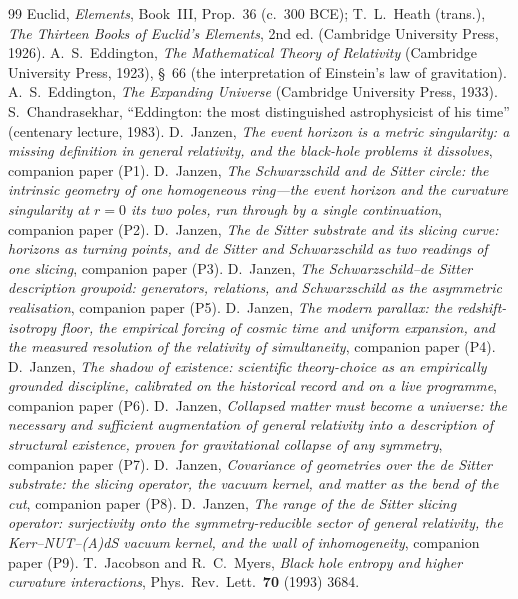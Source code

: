 \documentclass[11pt,a4paper]{article}
\theoremstyle{definition}
\begin{document}
\begin{thebibliography}{99}
 Euclid, \emph{Elements}, Book~III, Prop.~36 (c.~300 BCE);
T.~L.~Heath (trans.), \emph{The Thirteen Books of Euclid's Elements}, 2nd ed.
(Cambridge University Press, 1926).
 A.~S.~Eddington, \emph{The Mathematical Theory of
Relativity} (Cambridge University Press, 1923), \S~66 (the interpretation of
Einstein's law of gravitation).
 A.~S.~Eddington, \emph{The Expanding Universe}
(Cambridge University Press, 1933).
 S.~Chandrasekhar, ``Eddington: the most
distinguished astrophysicist of his time'' (centenary lecture, 1983).
 D.~Janzen, \emph{The event horizon is a metric singularity: a missing definition in general relativity, and the black-hole problems it dissolves}, companion paper (P1).
 D.~Janzen, \emph{The Schwarzschild and de Sitter circle: the intrinsic geometry of one homogeneous ring---the event horizon and the curvature singularity at $r=0$ its two poles, run through by a single continuation}, companion paper (P2).
 D.~Janzen, \emph{The de Sitter substrate and its slicing curve: horizons as turning points, and de Sitter and Schwarzschild as two readings of one slicing}, companion paper (P3).
 D.~Janzen, \emph{The Schwarzschild--de Sitter description groupoid: generators, relations, and Schwarzschild as the asymmetric realisation}, companion paper (P5).
 D.~Janzen, \emph{The modern parallax: the redshift-isotropy floor, the empirical forcing of cosmic time and uniform expansion, and the measured resolution of the relativity of simultaneity}, companion paper (P4).
 D.~Janzen, \emph{The shadow of existence: scientific theory-choice as an empirically grounded discipline, calibrated on the historical record and on a live programme}, companion paper (P6).
 D.~Janzen, \emph{Collapsed matter must become a universe: the necessary and sufficient augmentation of general relativity into a description of structural existence, proven for gravitational collapse of any symmetry}, companion paper (P7).
 D.~Janzen, \emph{Covariance of geometries over the de Sitter substrate: the slicing operator, the vacuum kernel, and matter as the bend of the cut}, companion paper (P8).
 D.~Janzen, \emph{The range of the de Sitter slicing operator: surjectivity onto the symmetry-reducible sector of general relativity, the Kerr--NUT--(A)dS vacuum kernel, and the wall of inhomogeneity}, companion paper (P9).
T.~Jacobson and R.~C.~Myers,
\emph{Black hole entropy and higher curvature interactions},
Phys.~Rev.~Lett.~\textbf{70} (1993) 3684.


\end{thebibliography}
\end{document}

